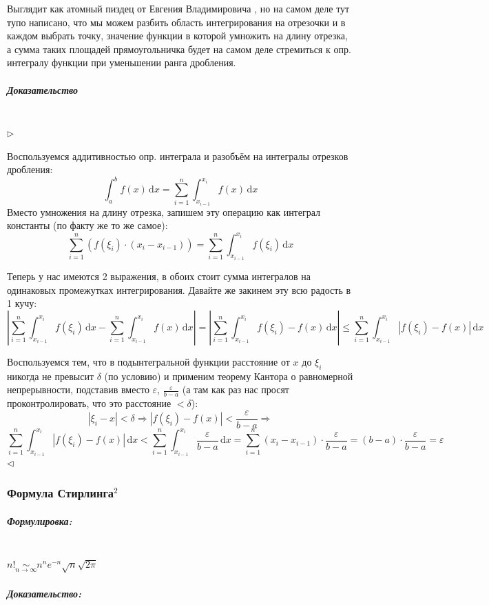 \documentclass{article}
\def\D{\,\mathrm{d}}
\let\vanillasubparagraph\subparagraph
\renewcommand{\subparagraph}[1]{\vanillasubparagraph{#1}\mbox{}\\}
\begin{document}
Выглядит как атомный пиздец от Евгения Владимировича \Frowny, но на самом деле тут тупо написано, что мы можем разбить область интегрирования на отрезочки и в каждом выбрать точку, значение функции в которой умножить на длину отрезка, а сумма таких площадей прямоугольничка будет на самом деле стремиться к опр. интегралу функции при уменьшении ранга дробления. \Smiley

\subparagraph{Доказательство}
$\rhd$

Воспользуемся аддитивностью опр. интеграла и разобъём на интегралы отрезков дробления:
$$
\int_a^b f(x) \D x = \sum_{i=1}^n \int_{x_{i-1}}^{x_i} f(x) \D x
$$
Вместо умножения на длину отрезка, запишем эту операцию как интеграл константы (по факту же то же самое):
$$
\sum_{i=1}^n (f(\xi_i) \cdot (x_i - x_{i-1})) = \sum_{i=1}^n \int_{x_{i-1}}^{x_i} f(\xi_i) \D x
$$

Теперь у нас имеются 2 выражения, в обоих стоит сумма интегралов на одинаковых промежутках интегрирования. Давайте же закинем эту всю радость в 1 кучу:
$$
\left|\sum_{i=1}^n \int_{x_{i-1}}^{x_i} f(\xi_i) \D x  -   \sum_{i=1}^n\int_{x_{i-1}}^{x_i} f(x) \D x\right| = \left|\sum_{i=1}^n \int_{x_{i-1}}^{x_i} f(\xi_i) - f(x) \D x\right| \le \sum_{i=1}^n \int_{x_{i-1}}^{x_i} \left| f(\xi_i) - f(x) \right| \D x
$$

Воспользуемся тем, что в подынтегральной функции расстояние от $x$ до $\xi_i$ никогда не превысит $\delta$ (по условию) и применим теорему Кантора о равномерной непрерывности, подставив вместо $\varepsilon$, $\frac{\varepsilon}{b - a}$ (а там как раз нас просят проконтролировать, что это расстояние $< \delta$):
$$
|\xi_i - x| < \delta \Rightarrow \left| f(\xi_i) - f(x) \right| < \frac{\varepsilon}{b-a} \Rightarrow
$$
$$\sum_{i=1}^n \int_{x_{i-1}}^{x_i} \left| f(\xi_i) - f(x) \right| \D x < \sum_{i=1}^n \int_{x_{i-1}}^{x_i} \frac{\varepsilon}{b-a} \D x = \sum_{i=1}^n (x_i - x_{i-1}) \cdot \frac{\varepsilon}{b-a} = (b - a) \cdot \frac{\varepsilon}{b-a} = \varepsilon
$$
$\lhd$

\subsubsection{Формула Стирлинга\texorpdfstring{$^2$}{}}
\subparagraph{Формулировка:}

$n! \underset{n \rightarrow \infty}{\sim} n^ne^{-n}\sqrt{n}\sqrt{2\pi}$

\subparagraph{Доказательство:}


\end{document}
